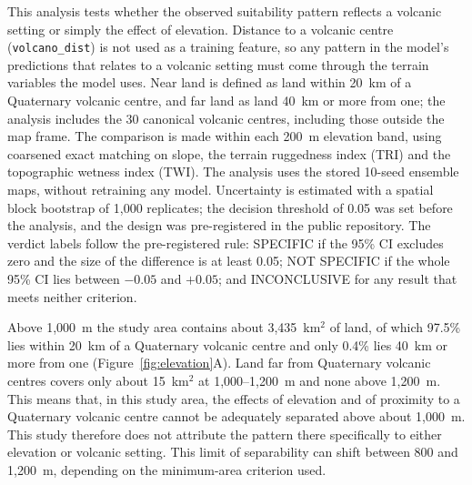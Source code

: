 \documentclass[12pt]{article}
\begin{document}
This analysis tests whether the observed suitability pattern reflects a volcanic setting or simply the effect of elevation.
Distance to a volcanic centre (\texttt{volcano\_dist}) is not used as a training feature, so any pattern in the model's predictions that relates to a volcanic setting must come through the terrain variables the model uses.
Near land is defined as land within 20~km of a Quaternary volcanic centre, and far land as land 40~km or more from one; the analysis includes the 30 canonical volcanic centres, including those outside the map frame.
The comparison is made within each 200~m elevation band, using coarsened exact matching on slope, the terrain ruggedness index (TRI) and the topographic wetness index (TWI).
The analysis uses the stored 10-seed ensemble maps, without retraining any model.
Uncertainty is estimated with a spatial block bootstrap of 1,000 replicates; the decision threshold of 0.05 was set before the analysis, and the design was pre-registered in the public repository.
The verdict labels follow the pre-registered rule: SPECIFIC if the 95\% CI excludes zero and the size of the difference is at least 0.05; NOT SPECIFIC if the whole 95\% CI lies between $-0.05$ and $+0.05$; and INCONCLUSIVE for any result that meets neither criterion.

Above 1,000~m the study area contains about 3,435~km$^2$ of land, of which 97.5\% lies within 20~km of a Quaternary volcanic centre and only 0.4\% lies 40~km or more from one (Figure~\ref{fig:elevation}A).
Land far from Quaternary volcanic centres covers only about 15~km$^2$ at 1,000--1,200~m and none above 1,200~m.
This means that, in this study area, the effects of elevation and of proximity to a Quaternary volcanic centre cannot be adequately separated above about 1,000~m.
This study therefore does not attribute the pattern there specifically to either elevation or volcanic setting.
This limit of separability can shift between 800 and 1,200~m, depending on the minimum-area criterion used.
\end{document}
